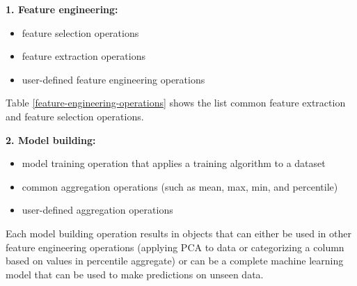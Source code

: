 \textbf{1. Feature engineering:}
\begin{itemize}
\item feature selection operations
\item feature extraction operations
\item user-defined feature engineering operations
\end{itemize}

Table \ref{feature-engineering-operations} shows the list common feature extraction and feature selection operations.

\textbf{2. Model building: }
\begin{itemize}
\item model training operation that applies a training algorithm to a dataset
\item common aggregation operations (such as mean, max, min, and percentile)
\item user-defined aggregation operations 
\end{itemize}
Each model building operation results in objects that can either be used in other feature engineering operations (applying PCA to data or categorizing a column based on values in percentile aggregate) or can be a complete machine learning model that can be used to make predictions on unseen data.

